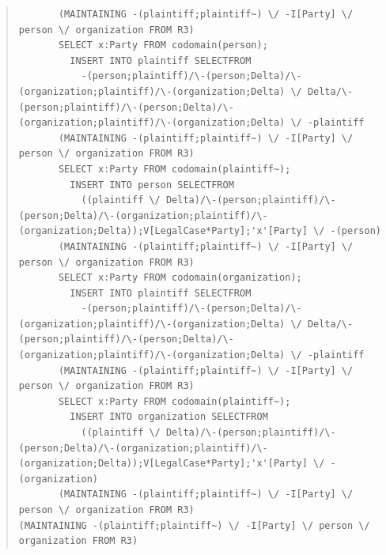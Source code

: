 \documentclass[10pt,a4paper]{report}              %
\theoremstyle{plain}\theorembodyfont{\rmfamily}\newtheorem{definition}{Definition}[section]
\theoremstyle{plain}\theorembodyfont{\rmfamily}\newtheorem{designrule}[definition]{Requirement}
\begin{document}
\begin{quote}
\begin{verbatim}
       (MAINTAINING -(plaintiff;plaintiff~) \/ -I[Party] \/ person \/ organization FROM R3)
       SELECT x:Party FROM codomain(person);
         INSERT INTO plaintiff SELECTFROM
           -(person;plaintiff)/\-(person;Delta)/\-(organization;plaintiff)/\-(organization;Delta) \/ Delta/\-(person;plaintiff)/\-(person;Delta)/\-(organization;plaintiff)/\-(organization;Delta) \/ -plaintiff
       (MAINTAINING -(plaintiff;plaintiff~) \/ -I[Party] \/ person \/ organization FROM R3)
       SELECT x:Party FROM codomain(plaintiff~);
         INSERT INTO person SELECTFROM
           ((plaintiff \/ Delta)/\-(person;plaintiff)/\-(person;Delta)/\-(organization;plaintiff)/\-(organization;Delta));V[LegalCase*Party];'x'[Party] \/ -(person)
       (MAINTAINING -(plaintiff;plaintiff~) \/ -I[Party] \/ person \/ organization FROM R3)
       SELECT x:Party FROM codomain(organization);
         INSERT INTO plaintiff SELECTFROM
           -(person;plaintiff)/\-(person;Delta)/\-(organization;plaintiff)/\-(organization;Delta) \/ Delta/\-(person;plaintiff)/\-(person;Delta)/\-(organization;plaintiff)/\-(organization;Delta) \/ -plaintiff
       (MAINTAINING -(plaintiff;plaintiff~) \/ -I[Party] \/ person \/ organization FROM R3)
       SELECT x:Party FROM codomain(plaintiff~);
         INSERT INTO organization SELECTFROM
           ((plaintiff \/ Delta)/\-(person;plaintiff)/\-(person;Delta)/\-(organization;plaintiff)/\-(organization;Delta));V[LegalCase*Party];'x'[Party] \/ -(organization)
       (MAINTAINING -(plaintiff;plaintiff~) \/ -I[Party] \/ person \/ organization FROM R3)
(MAINTAINING -(plaintiff;plaintiff~) \/ -I[Party] \/ person \/ organization FROM R3)
\end{verbatim}
\end{quote}
\end{document}
